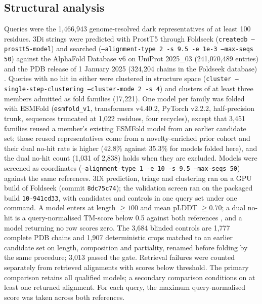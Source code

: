 \subsection*{Structural analysis}
Queries were the 1{,}466{,}943 genome-resolved dark representatives of at least 100 residues. 3Di
strings were predicted with ProstT5 \citep{heinzinger2024prostt5} through Foldseek
\citep{vankempen2024foldseek} (\texttt{createdb --prostt5-model}) and searched
(\texttt{--alignment-type 2 -s 9.5 -e 1e-3 --max-seqs 50}) against the AlphaFold Database v6 on
UniProt 2025\_03 (241{,}070{,}489 entries) \citep{varadi2024alphafolddb} and the PDB release of 1
January 2025 (324{,}204 chains in the Foldseek database) \citep{berman2000pdb}. Queries with no hit
in either were clustered in structure space (\texttt{cluster --single-step-clustering --cluster-mode
2 -s 4}) and clusters of at least three members admitted as fold families (17{,}221). One model per
family was folded with ESMFold \citep{lin2023esmfold} (\texttt{esmfold\_v1}, transformers v4.40.2,
PyTorch v2.2.2, half-precision trunk, sequences truncated at 1{,}022 residues, four recycles), except
that 3{,}451 families reused a member's existing ESMFold model from an earlier candidate set; those
reused representatives come from a novelty-enriched prior cohort and their dual no-hit rate is higher
(42.8\% against 35.3\% for models folded here), and the dual no-hit count (1{,}031 of 2{,}838) holds when they are excluded.
Models were screened as coordinates (\texttt{--alignment-type 1 -e 10 -s 9.5 --max-seqs 50})
against the same references. 3Di prediction, triage and clustering ran on a GPU build of Foldseek
(commit \texttt{8dc75c74}); the validation screen ran on the packaged build \texttt{10-941cd33},
with candidates and controls in one query set under one command. A model enters at length
$\geq 100$ and mean pLDDT $\geq 0.70$; a dual no-hit is a query-normalised TM-score below 0.5 against
both references \citep{zhang2004tmscore}, and a
model returning no row scores zero. The 3{,}684 blinded controls are 1{,}777 complete PDB chains and
1{,}907 deterministic crops matched to an earlier candidate set on length, composition and
partiality, renamed before folding by the same procedure; 3{,}013 passed the gate. Retrieval failures were counted separately from retrieved alignments with scores below threshold.
The primary comparison retains all qualified models; a secondary comparison conditions on at least
one returned alignment. For each query, the maximum query-normalised score was taken across both references.

